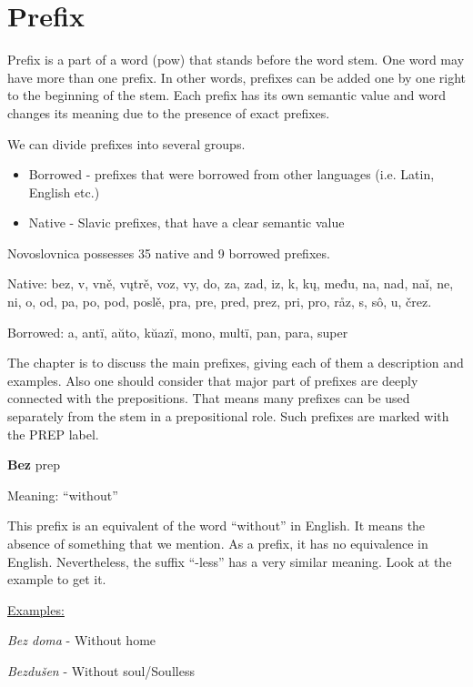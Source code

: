 \section{Prefix}


Prefix is a part of a word (\gls{pow}) that stands before the word stem. One word may have more than one prefix. In other words, prefixes can be added one by one right to the beginning of the stem. Each prefix has its own semantic value and word changes its meaning due to the presence of exact prefixes.

We can divide prefixes into several groups. 

\begin{itemize}
	\item Borrowed - prefixes that were borrowed from other languages (i.e. Latin, English etc.)
	\item Native - Slavic prefixes, that have a clear semantic value
\end{itemize}

Novoslovnica possesses 35 native and 9 borrowed prefixes.

Native: bez, v, vně, vųtrě, voz, vy, do, za, zad, iz, k, kų, među, na, nad, naǐ, ne, ni, o, od, pa, po, pod, poslě, pra, pre, pred, prez, pri, pro, råz, s, sô, u, črez.

Borrowed: a, antï, aŭto, kŭazï, mono, multï, pan, para, super

The chapter is to discuss the main prefixes, giving each of them a description and examples. Also one should consider that major part of prefixes are deeply connected with the prepositions. That means many prefixes can be used separately from the stem in a prepositional role. Such prefixes are marked with the PREP label. 

\textbf{Bez} \gls{prep}

Meaning: “without”

This prefix is an equivalent of the word “without” in English. It means the absence of something that we mention. As a prefix, it has no equivalence in English. Nevertheless, the suffix “-less” has a very similar meaning. Look at the example to get it.

\underline{Examples:}

\textit{Bez doma} - Without home

\textit{Bezdušen} - Without soul/Soulless 



